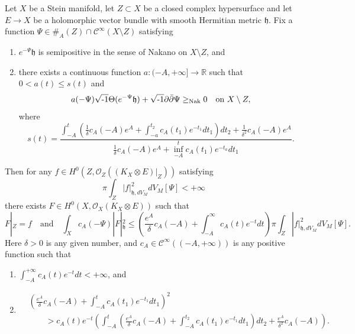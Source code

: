 \documentclass[12pt,hidelinks]{amsart}
\newcommand{\cO}{{\mathcal O}}
\newcommand{\sC}{{\mathscr C}}
\newcommand{\fh}{{\mathfrak h}}
\newcommand{\bbR}{{\mathbb R}}
\newcommand{\di}{\partial}
\newcommand{\dbar}{\bar \partial}
\newcommand{\ii}{\sqrt{\text{\rm -}1}}
\newcommand{\tensor}{\otimes}
\begin{document}
\begin{thm}\label{gz-thm}
Let $X$ be a Stein manifold, let $Z \subset X$ be a closed complex hypersurface and let $E \to X$ be a holomorphic vector bundle with smooth Hermitian metric $\fh$.  Fix a function $\Psi \in \# _A(Z) \cap \sC^{\infty}(X\setminus Z)$ satisfying 
\begin{enumerate}[{\rm (i)}]
\item $e^{-\Psi} \fh$ is semipositive in the sense of Nakano on $X\setminus Z$, and 
\item there exists a continuous function $a: (-A, +\infty] \to \bbR$ such that $0 < a(t) \le s(t)$ and 
\[
a(-\Psi) \ii \Theta (e^{-\Psi}\fh) + \ii \di \dbar \Psi \ge _{\rm Nak} 0 \quad \text{on }X \setminus Z,
\]
where 
\[
s(t) = \frac{\int _{-A} ^t \left ( \frac{1}{\delta}c_A(-A)e^A + \int _{-a} ^{t_2} c_A(t_1) e^{-t_1}dt_1 \right ) dt_2 + \frac{1}{\delta ^2}c_A(-A)e^A}{\frac{1}{\delta} c_A(-A)e^A + \inf _{-A} ^t c_A(t_1)e^{-t_a} dt_1}.
\]
\end{enumerate} 
Then for any $f \in H^0(Z, \cO _Z((K_X \tensor E)|_Z))$ satisfying 
\[
\pi \int _Z |f|^2_{\fh,dV_M} dV_M[\Psi] < +\infty
\]
there exists $F \in H^0(X, \cO _X(K_X \tensor E))$ such that 
\[
F|_Z = f \quad \text{and} \quad \int _X c_A(-\Psi) |F|^2_{\fh} \le \left (\frac{e^A}{\delta} c_A(-A) + \int _{-A} ^{\infty} c_A(t) e^{-t} dt \right ) \pi \int _Z |f|^2_{\fh,dV_M} dV_M[\Psi].
\]
Here $\delta > 0$ is any given number, and $c_A\in \sC^{\infty}((-A, +\infty))$ is any positive function such that 
\begin{enumerate}[{\rm (a)}]
\item $\displaystyle{\int _{-A} ^{+\infty} c_A(t) e^{-t} dt < +\infty}$,  and 
\item 
\begin{align*}
& \left (\frac{e^A}{\delta} c_A(-A) + \int _{-A} ^t c_A(t_1)e^{-t_1} dt_1 \right )^2 \\
& \qquad > c_A(t)e^{-t} \left ( \int _{-A} ^t \left ( \frac{e^A}{\delta} c_A(-A) + \int _{-A} ^{t_2}c_A(t_1)e^{-t_1}dt_1\right ) dt_2 + \frac{e^A}{\delta ^2}c_A(-A) \right ).
\end{align*}
\end{enumerate}
\end{thm}
\end{document}
